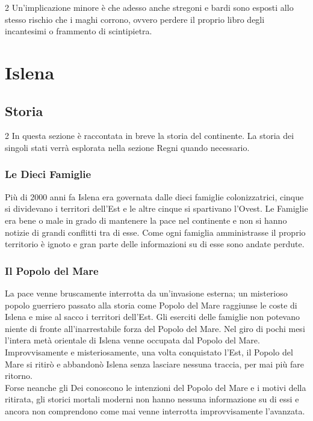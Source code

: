 \documentclass[10pt, a4paper]{report}
\newcommand{\partimagefile}{}
\newcommand{\partimage}[1]{%
	\renewcommand{\partimagefile}{#1}%
}
\begin{document}
\begin{multicols}{2}
Un'implicazione minore è che adesso anche stregoni e bardi sono esposti allo stesso rischio che i maghi corrono, ovvero perdere il proprio libro degli incantesimi o frammento di scintipietra.


\end{multicols}

\partimage{islenapart.png}
\part{Islena}

\chapter{Storia}
\begin{multicols}{2}	
	In questa sezione è raccontata in breve la storia del continente. La storia dei singoli stati verrà esplorata nella sezione Regni quando necessario. 
\section*{Le Dieci Famiglie}
Più di 2000 anni fa Islena era governata dalle dieci famiglie colonizzatrici, cinque si dividevano i territori dell'Est e le altre cinque si spartivano l'Ovest. Le Famiglie era bene o male in grado di mantenere la pace nel continente e non si hanno notizie di grandi conflitti tra di esse. Come ogni famiglia amministrasse il proprio territorio è ignoto e gran parte delle informazioni su di esse sono andate perdute. 
\section*{Il Popolo del Mare}
La pace venne bruscamente interrotta da un’invasione esterna; un misterioso popolo guerriero passato alla storia come Popolo del Mare raggiunse le coste di Islena e mise al sacco i territori dell’Est. Gli eserciti delle famiglie non potevano niente di fronte all’inarrestabile forza del Popolo del Mare. Nel giro di pochi mesi l’intera metà orientale di Islena venne occupata dal Popolo del Mare.\\
Improvvisamente e misteriosamente, una volta conquistato l’Est, il Popolo del Mare si ritirò e abbandonò Islena senza lasciare nessuna traccia, per mai più fare ritorno. \\
Forse neanche gli Dei conoscono le intenzioni del Popolo del Mare e i motivi della ritirata, gli storici mortali moderni non hanno nessuna informazione su di essi e ancora non comprendono come mai venne interrotta improvvisamente l’avanzata. 

\end{multicols}
\end{document}
